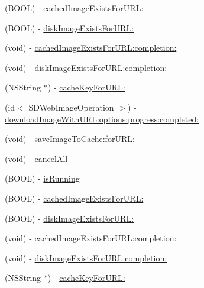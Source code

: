 \begin{DoxyCompactItemize}
\item 
(B\+O\+OL) -\/ \mbox{\hyperlink{interface_s_d_web_image_manager_a9634c36e65314e0b973056a96f6a62e2}{cached\+Image\+Exists\+For\+U\+R\+L\+:}}
\item 
(B\+O\+OL) -\/ \mbox{\hyperlink{interface_s_d_web_image_manager_a7ed53c304da787466f777c636447e6d0}{disk\+Image\+Exists\+For\+U\+R\+L\+:}}
\item 
(void) -\/ \mbox{\hyperlink{interface_s_d_web_image_manager_a5583bb0fba17b92ce2fe9245b6ecafd2}{cached\+Image\+Exists\+For\+U\+R\+L\+:completion\+:}}
\item 
(void) -\/ \mbox{\hyperlink{interface_s_d_web_image_manager_a05c93459fc0727ca8e7139cfc9d9750c}{disk\+Image\+Exists\+For\+U\+R\+L\+:completion\+:}}
\item 
(N\+S\+String $\ast$) -\/ \mbox{\hyperlink{interface_s_d_web_image_manager_a6f02c3f166329cdc53553621a7f8c04a}{cache\+Key\+For\+U\+R\+L\+:}}
\item 
(id$<$ S\+D\+Web\+Image\+Operation $>$) -\/ \mbox{\hyperlink{interface_s_d_web_image_manager_a975d3dc781fe58ad92f6a40d06c98f35}{download\+Image\+With\+U\+R\+L\+:options\+:progress\+:completed\+:}}
\item 
(void) -\/ \mbox{\hyperlink{interface_s_d_web_image_manager_acd286f805e3334824648122fd213937e}{save\+Image\+To\+Cache\+:for\+U\+R\+L\+:}}
\item 
(void) -\/ \mbox{\hyperlink{interface_s_d_web_image_manager_a8cd0959562d0120f6a1976b8f9d49b7b}{cancel\+All}}
\item 
(B\+O\+OL) -\/ \mbox{\hyperlink{interface_s_d_web_image_manager_afc97641bfb1b30b1a262462a12c56c46}{is\+Running}}
\item 
(B\+O\+OL) -\/ \mbox{\hyperlink{interface_s_d_web_image_manager_a9634c36e65314e0b973056a96f6a62e2}{cached\+Image\+Exists\+For\+U\+R\+L\+:}}
\item 
(B\+O\+OL) -\/ \mbox{\hyperlink{interface_s_d_web_image_manager_a7ed53c304da787466f777c636447e6d0}{disk\+Image\+Exists\+For\+U\+R\+L\+:}}
\item 
(void) -\/ \mbox{\hyperlink{interface_s_d_web_image_manager_a5583bb0fba17b92ce2fe9245b6ecafd2}{cached\+Image\+Exists\+For\+U\+R\+L\+:completion\+:}}
\item 
(void) -\/ \mbox{\hyperlink{interface_s_d_web_image_manager_a05c93459fc0727ca8e7139cfc9d9750c}{disk\+Image\+Exists\+For\+U\+R\+L\+:completion\+:}}
\item 
(N\+S\+String $\ast$) -\/ \mbox{\hyperlink{interface_s_d_web_image_manager_a6f02c3f166329cdc53553621a7f8c04a}{cache\+Key\+For\+U\+R\+L\+:}}

\end{DoxyCompactItemize}
